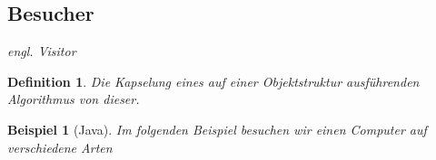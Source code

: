 \documentclass[a4paper]{article}
\theoremstyle{break}
\newtheorem{defi}{Definition}[section]
\newtheorem{ex}{Beispiel}[section]
\begin{document}
\newpage
\subsection{Besucher}

\textit{engl. Visitor}

\begin{defi}
	Die Kapselung eines auf einer Objektstruktur ausführenden Algorithmus von dieser.
\end{defi}

\begin{ex}[Java]
	Im folgenden Beispiel besuchen wir einen Computer auf verschiedene Arten
	
	
	
	
	
	
	
	
	
	
	
	
	
\end{ex}
\end{document}
